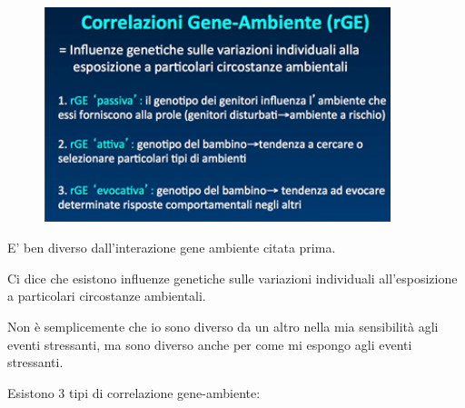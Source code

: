 \begin{figure}[!ht]
\centering
	\includegraphics[width=0.9\textwidth]{011/image6.png}
\end{figure}

E'
ben diverso dall'interazione gene ambiente citata prima.

Ci dice che esistono influenze genetiche sulle variazioni individuali
all'esposizione a particolari circostanze ambientali.

Non è semplicemente che io sono diverso da un altro nella mia
sensibilità agli eventi stressanti, ma sono diverso anche per come mi
espongo agli eventi stressanti.

Esistono 3 tipi di correlazione gene-ambiente:

